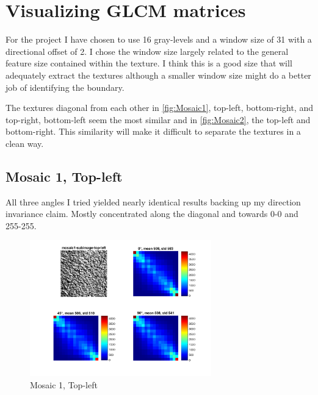 \documentclass[a4paper,12pt,titlepage]{article}
\begin{document}
\section{Visualizing GLCM matrices}
For the project I have chosen to use 16 gray-levels and a window size of 31 with a directional offset of 2. I chose the window size largely related to the general feature size contained within the texture. I think this is a good size that will adequately extract the textures although a smaller window size might do a better job of identifying the boundary.

The textures diagonal from each other in \ref{fig:Mosaic1}, top-left, bottom-right, and top-right, bottom-left seem the most similar and in \ref{fig:Mosaic2}, the top-left and bottom-right. This similarity will make it difficult to separate the textures in a clean way.

\subsection{Mosaic 1, Top-left}
All three angles I tried yielded nearly identical results backing up my direction invariance claim. Mostly concentrated along the diagonal and towards 0-0 and 255-255.

\begin{figure}[H]
\includegraphics[width=0.7\textwidth]{partB-mosaic1-subimage-top-left}
\caption{Mosaic 1, Top-left}
\label{fig:Mosaic1SubimageTopLeft}
\end{figure}

\end{document}
